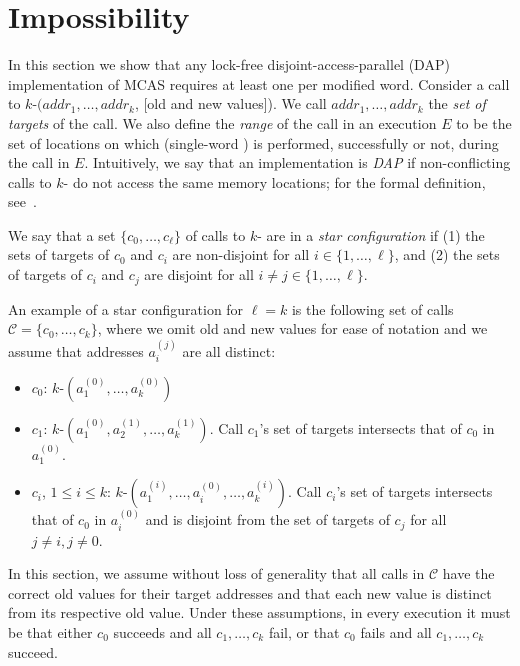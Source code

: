 \section{Impossibility}\label{sec:lowerbound}

In this section we show that any lock-free disjoint-access-parallel (DAP) implementation of MCAS requires at least one \cas{} per modified word. Consider a call to $k$-\cas$(addr_1, \dots, addr_k$, [old and new values]). We call ${addr_1, \dots, addr_k}$ the \textit{set of targets} of the call. We also define the \textit{range} of the call in an execution $E$ to be the set of locations on which \cas{} (single-word \cas) is performed, successfully or not, during the call in $E$. 
Intuitively, we say that an \mcas{} implementation is \textit{DAP} if non-conflicting calls to $k$-\cas{} do not access the same memory locations; for the formal definition, see~\cite{israeli94}.

\begin{definition}
We say that a set $\lbrace c_0, \dots ,c_\ell \rbrace$ of calls to $k$-\cas{} are in a \emph{star configuration} if (1) the sets of targets of $c_0$ and $c_i$ are non-disjoint for all $i \in \lbrace 1,\dots,\ell\rbrace$, and (2) the sets of targets of $c_i$ and $c_j$ are disjoint for all $i\ne j\in\lbrace1,\dots,\ell\rbrace$.
\end{definition}

An example of a star configuration for $\ell = k$ is the following set of calls $\mathcal{C} = \lbrace c_0, \dots ,c_k\rbrace$, where we omit old and new values for ease of notation and we assume that addresses $a_i^{(j)}$ are all distinct:
\begin{itemize}
    \item $c_0$: $k$-\cas{}$(a_1^{(0)}, \dots, a_k^{(0)})$
    \item $c_1$: $k$-\cas{}$(a_1^{(0)}, a_2^{(1)}, \dots, a_k^{(1)})$. Call $c_1$'s set of targets intersects that of $c_0$ in $a_1^{(0)}$.
    \item $c_i$, $1\leq i \leq k$: $k$-\cas{}$(a_1^{(i)}, \dots, a_i^{(0)}, \dots, a_k^{(i)})$. Call $c_i$'s set of targets intersects that of $c_0$ in $a_i^{(0)}$ and is disjoint from the set of targets of $c_j$ for all $j\ne i, j\ne0$.
\end{itemize}

In this section, we assume without loss of generality that all calls in $\mathcal{C}$ have the correct old values for their target addresses and that each new value is distinct from its respective old value. Under these assumptions, in every execution it must be that either $c_0$ succeeds and all $c_1,\dots,c_k$ fail, or that $c_0$
 fails and all $c_1,\dots,c_k$ succeed.


